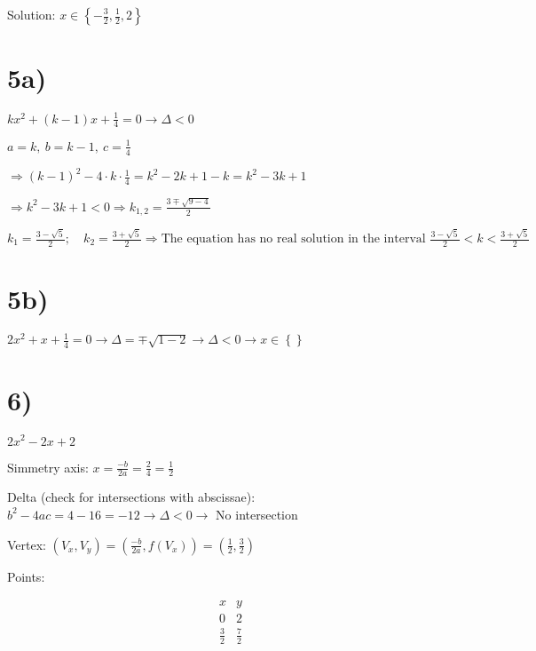 \documentclass{article}
\begin{document}
Solution: \(x \in \left\{-\frac{3}{2}, \frac{1}{2}, 2\right\}\)

\section*{5a)}
\(kx^2+(k-1)x+\frac{1}{4}=0 \rightarrow \Delta < 0\)

\(a=k,\ b=k-1,\ c=\frac{1}{4}\)

\(\Rightarrow (k-1)^2-4 \cdot k \cdot \frac{1}{4} = k^2-2k+1-k = k^2-3k+1\)

\(\Rightarrow k^2-3k+1<0 \Rightarrow k_{1,2}=\frac{3 \mp \sqrt{9-4}}{2}\)

\(k_1=\frac{3-\sqrt{5}}{2}; \quad k_2=\frac{3+\sqrt{5}}{2} \Rightarrow
\text{The equation has no real solution in the interval } \frac{3-\sqrt{5}}{2} < k < \frac{3+\sqrt{5}}{2}\)

\section*{5b)}
\(2x^2+x+\frac{1}{4}=0 \rightarrow \Delta=\mp \sqrt{1-2} \rightarrow 
\Delta < 0 \rightarrow x \in \left\{\right\}\)

\section*{6)}
\(2x^2 - 2x +2\)

Simmetry axis: \(x=\frac{-b}{2a}=\frac{2}{4}=\frac{1}{2}\)

Delta (check for intersections with abscissae):
\(b^2 - 4ac = 4-16 = -12 \rightarrow \Delta < 0 \rightarrow\)
No intersection

Vertex: \((V_x, V_y) = \left(\frac{-b}{2a}, f(V_x)\right)=
\left(\frac{1}{2}, \frac{3}{2}\right)\)

Points: \vspace*{-0.5cm}
\begin{center}
    \[\begin{array}{c|c}
        x & y \\
        \hline 0 & 2 \\
        \frac{3}{2} & \frac{7}{2}
    \end{array}\]
\end{center}
\end{document}
